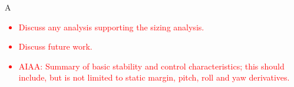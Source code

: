 A

\textcolor{red}{
\begin{itemize}
    \item Discuss any analysis supporting the sizing analysis.
    \item Discuss future work.
    \item AIAA: Summary of basic stability and control characteristics; this should include, but is not
    limited to static margin, pitch, roll and yaw derivatives.
\end{itemize}}